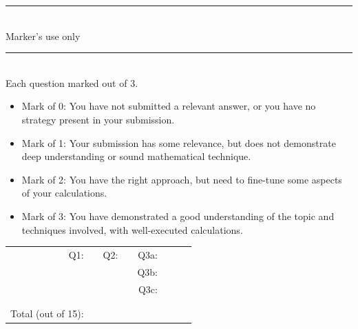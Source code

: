 \documentclass[a4paper, 11pt]{report}
\begin{document}
	\hrule ${}^{}$ \\
	Marker's use only
	\\
	\hrule ${}^{}$ \\
	Each question marked out of 3.
	\begin{itemize}
	\item Mark of 0: You have not submitted a relevant answer, or you have no strategy present in your
	submission.\\
	\item Mark of 1: Your submission has some relevance, but does not demonstrate deep understanding or
	sound mathematical technique. \\ 
	\item Mark of 2: You have the right approach, but need to fine-tune some aspects of your
	calculations.\\
	\item Mark of 3: You have demonstrated a good understanding of the topic and techniques involved,
	with well-executed calculations. \\ 
	\end{itemize}
	\begin{tabular}{rrrrrrrr}
	Q1:& \hspace{2cm} & Q2: & \hspace{2cm} & Q3a: & \hspace{2cm} &   & \\[.5cm]
		 & \hspace{2cm} &     & \hspace{2cm} & Q3b: & \hspace{2cm} &   & \\[.5cm]
		 & \hspace{2cm} &     & \hspace{2cm} & Q3c: & \hspace{2cm} &   & \\[.5cm]
	& \hspace{2cm} &  & \hspace{2cm} & & \hspace{2cm} &  & \\[.5cm]
	&&&&&&& \\
	Total (out of 15): &&&&&&& \\
	\end{tabular}
	
\vfill
\newpage
	
\end{document}
